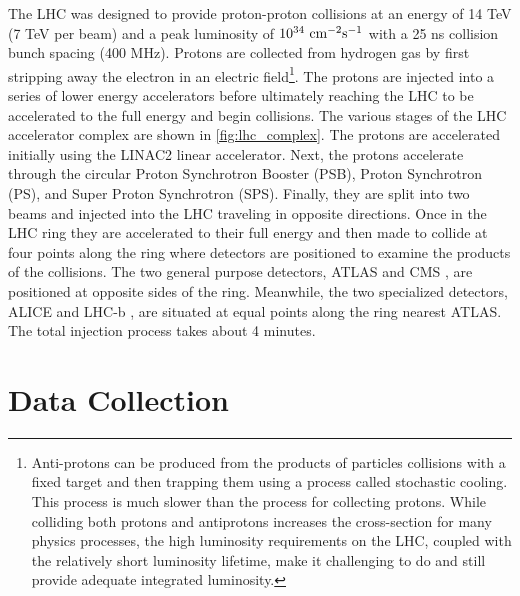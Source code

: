 The LHC was designed to provide proton-proton collisions
at an energy of 14 TeV (7 TeV per beam) 
and a peak luminosity of $10^{34}~\textrm{cm}^{-2}\textrm{s}^{-1}$ with a 25 ns collision
bunch spacing (400 MHz).
Protons are collected from hydrogen gas by first stripping away 
the electron in an electric field\footnote{Anti-protons
can be produced  from the products of 
particles collisions with a fixed target and
then trapping them using a process called stochastic cooling. This process
is much slower than the process for collecting protons. While colliding both 
protons and antiprotons increases the cross-section
for many physics processes, the high luminosity requirements on the LHC,
coupled with the relatively short luminosity lifetime, make it challenging
to do and still provide adequate integrated luminosity.}.
The protons are injected
into a series of lower energy accelerators before ultimately 
reaching the LHC to be accelerated to the full energy and 
begin collisions. The various stages of the LHC accelerator
complex are shown in \fig\ref{fig:lhc_complex}.
The protons are accelerated initially using the LINAC2 linear
accelerator. Next, the protons accelerate through the circular
Proton Synchrotron Booster (PSB), Proton Synchrotron (PS),
and Super Proton Synchrotron (SPS). Finally, they 
are split into two beams and injected into the LHC
traveling in opposite directions. Once in the LHC
ring they are accelerated to their full energy and then made
to collide at four points along the ring where detectors
are positioned to examine the products of the collisions.
The two general purpose detectors, ATLAS \cite{ATLAS} and CMS \cite{CMS}, 
are positioned at opposite sides of the ring. 
Meanwhile, the two specialized detectors, ALICE \cite{ALICE} 
and LHC-b \cite{LHCB}, are situated at equal points along the ring
nearest ATLAS.
The total injection process takes about 4 minutes.




\section{Data Collection}

